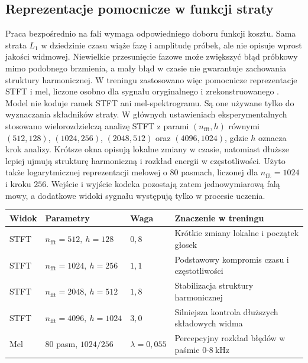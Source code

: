 \subsection{Reprezentacje pomocnicze w funkcji straty}

Praca bezpośrednio na fali wymaga odpowiedniego doboru funkcji kosztu. Sama strata \(L_1\) w dziedzinie czasu wiąże fazę i amplitudę próbek, ale nie opisuje wprost jakości widmowej. Niewielkie przesunięcie fazowe może zwiększyć błąd próbkowy mimo podobnego brzmienia, a mały błąd w czasie nie gwarantuje zachowania struktury harmonicznej. W treningu zastosowano więc pomocnicze reprezentacje STFT i mel, liczone osobno dla sygnału oryginalnego i zrekonstruowanego \cite{Yamamoto2020ParallelWaveGAN,Zeghidour2021SoundStream,Defossez2022Encodec}. Model nie koduje ramek STFT ani mel-spektrogramu. Są one używane tylko do wyznaczania składników straty. W głównych ustawieniach eksperymentalnych stosowano wielorozdzielczą analizę STFT z parami \((n_\mathrm{fft}, h)\) równymi \((512,128)\), \((1024,256)\), \((2048,512)\) oraz \((4096,1024)\), gdzie \(h\) oznacza krok analizy. Krótsze okna opisują lokalne zmiany w czasie, natomiast dłuższe lepiej ujmują strukturę harmoniczną i rozkład energii w częstotliwości. Użyto także logarytmicznej reprezentacji melowej o \(80\) pasmach, liczonej dla \(n_\mathrm{fft}=1024\) i kroku \(256\). Wejście i wyjście kodeka pozostają zatem jednowymiarową falą mowy, a dodatkowe widoki sygnału występują tylko w procesie uczenia.

\begin{center}
\centering
\footnotesize
\setlength{\tabcolsep}{3pt}
\begin{tabular}{>{\raggedright\arraybackslash}p{} >{\raggedright\arraybackslash}p{} >{\raggedright\arraybackslash}p{} >{\raggedright\arraybackslash}p{}}
\toprule
Widok & Parametry & Waga & Znaczenie w treningu \\
\midrule
STFT & \(n_\mathrm{fft}=512,\ h=128\) & \(0{,}8\) & Krótkie zmiany lokalne i początek głosek \\
STFT & \(n_\mathrm{fft}=1024,\ h=256\) & \(1{,}1\) & Podstawowy kompromis czasu i częstotliwości \\
STFT & \(n_\mathrm{fft}=2048,\ h=512\) & \(1{,}8\) & Stabilizacja struktury harmonicznej \\
STFT & \(n_\mathrm{fft}=4096,\ h=1024\) & \(3{,}0\) & Silniejsza kontrola dłuższych składowych widma \\
Mel & \(80\) pasm, \(1024/256\) & \(\lambda=0{,}055\) & Percepcyjny rozkład błędów w paśmie \(0\)-\(8\ \mathrm{kHz}\) \\
\bottomrule
\end{tabular}
\label{tab:widmowe-reprezentacje-referencyjne}
\end{center}

